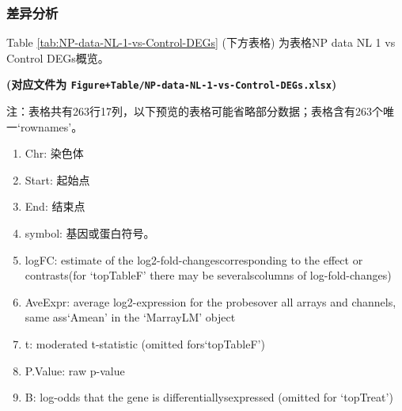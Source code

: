 \documentclass[
]{article}
\providecommand{\tightlist}{%
  \setlength{\itemsep}{0pt}\setlength{\parskip}{0pt}}
\begin{document}
\hypertarget{ux5deeux5f02ux5206ux6790-1}{%
\subsubsection{差异分析}\label{ux5deeux5f02ux5206ux6790-1}}

Table \ref{tab:NP-data-NL-1-vs-Control-DEGs} (下方表格) 为表格NP data NL 1 vs Control DEGs概览。

\textbf{(对应文件为 \texttt{Figure+Table/NP-data-NL-1-vs-Control-DEGs.xlsx})}

\begin{center}\begin{tcolorbox}[colback=gray!10, colframe=gray!50, width=0.9\linewidth, arc=1mm, boxrule=0.5pt]注：表格共有263行17列，以下预览的表格可能省略部分数据；表格含有263个唯一`rownames'。
\end{tcolorbox}
\end{center}
\begin{center}\begin{tcolorbox}[colback=gray!10, colframe=gray!50, width=0.9\linewidth, arc=1mm, boxrule=0.5pt]\begin{enumerate}\tightlist
\item Chr: 染色体
\item Start: 起始点
\item End: 结束点
\item symbol: 基因或蛋白符号。
\item logFC: estimate of the log2-fold-changescorresponding to the effect or contrasts(for ‘topTableF’ there may be severalscolumns of log-fold-changes)
\item AveExpr: average log2-expression for the probesover all arrays and channels, same ass‘Amean’ in the ‘MarrayLM’ object
\item t: moderated t-statistic (omitted fors‘topTableF’)
\item P.Value: raw p-value
\item B: log-odds that the gene is differentiallysexpressed (omitted for ‘topTreat’)
\end{enumerate}\end{tcolorbox}
\end{center}
\end{document}

